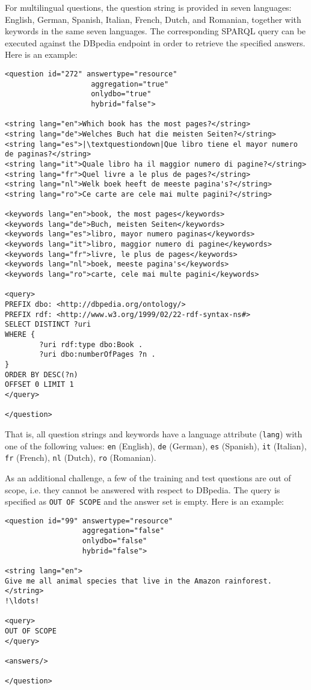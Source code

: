 For multilingual questions, the question string is provided in seven languages: English, German, Spanish, Italian, French, Dutch, and Romanian, 
together with keywords in the same seven languages. The corresponding SPARQL query can be executed against the DBpedia endpoint in order to 
retrieve the specified answers. 
Here is an example:

\begin{lstlisting}[escapechar=|]
<question id="272" answertype="resource" 
                    aggregation="true" 
                    onlydbo="true"
                    hybrid="false">

<string lang="en">Which book has the most pages?</string>
<string lang="de">Welches Buch hat die meisten Seiten?</string>
<string lang="es">|\textquestiondown|Que libro tiene el mayor numero de paginas?</string>
<string lang="it">Quale libro ha il maggior numero di pagine?</string>
<string lang="fr">Quel livre a le plus de pages?</string>
<string lang="nl">Welk boek heeft de meeste pagina's?</string>
<string lang="ro">Ce carte are cele mai multe pagini?</string>

<keywords lang="en">book, the most pages</keywords>
<keywords lang="de">Buch, meisten Seiten</keywords>
<keywords lang="es">libro, mayor numero paginas</keywords>
<keywords lang="it">libro, maggior numero di pagine</keywords>
<keywords lang="fr">livre, le plus de pages</keywords>
<keywords lang="nl">boek, meeste pagina's</keywords>
<keywords lang="ro">carte, cele mai multe pagini</keywords>

<query>
PREFIX dbo: <http://dbpedia.org/ontology/>
PREFIX rdf: <http://www.w3.org/1999/02/22-rdf-syntax-ns#> 
SELECT DISTINCT ?uri
WHERE { 
        ?uri rdf:type dbo:Book . 
        ?uri dbo:numberOfPages ?n .
}
ORDER BY DESC(?n)
OFFSET 0 LIMIT 1
</query>

</question>
\end{lstlisting}

That is, all question strings and keywords have a language attribute (\texttt{lang}) with one of the following values: 
\texttt{en} (English), \texttt{de} (German), \texttt{es} (Spanish), \texttt{it} (Italian), \texttt{fr} (French), \texttt{nl} (Dutch), \texttt{ro} (Romanian).

As an additional challenge, a few of the training and test questions are out of scope, i.e. they cannot be answered with respect to DBpedia. 
The query is specified as {\tt OUT OF SCOPE} and the answer set is empty. Here is an example:

\begin{lstlisting}[escapechar=!]
<question id="99" answertype="resource" 
                  aggregation="false" 
                  onlydbo="false"
                  hybrid="false">

<string lang="en">
Give me all animal species that live in the Amazon rainforest.
</string>
!\ldots!

<query>
OUT OF SCOPE
</query>

<answers/>

</question>
\end{lstlisting}


